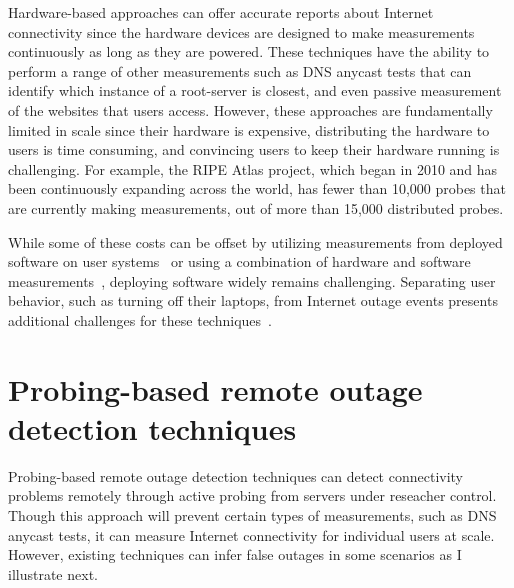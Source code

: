 


Hardware-based approaches can offer accurate reports about
Internet connectivity since the hardware devices are designed to make
measurements continuously as long as they are powered. These techniques have the
ability to perform a range of other measurements such as DNS anycast
tests that can identify which instance of a root-server is closest,
and even passive measurement of the websites that users
access. However, these approaches are fundamentally limited in scale
since their hardware is expensive, distributing the hardware to users
is time consuming, and convincing users to keep their hardware running
is challenging. For example, the RIPE Atlas project, which began in
2010 and has been continuously expanding across the world, has fewer than 10,000 probes that are currently making measurements, out
of more than 15,000 distributed probes.

While some of these costs can be offset by utilizing measurements from
deployed software on user systems~\cite{netdimes, dhcp-dimes, Dasu:NSDI2013} or using a combination of hardware
and software measurements~\cite{IMC2014-Broadband-bischof}, deploying software widely remains
challenging. Separating user behavior, such as turning off their laptops, from
Internet outage events presents additional challenges for these techniques~\cite{dhcp-dimes}.
 
\section{Probing-based remote outage detection techniques}


Probing-based remote outage detection techniques can detect
connectivity problems remotely through active probing from servers
under reseacher control. Though this approach will prevent 
certain types of measurements, such as DNS anycast tests, it can measure
Internet connectivity for individual users at scale. However,
existing techniques can infer false outages in some scenarios as I
illustrate next.

